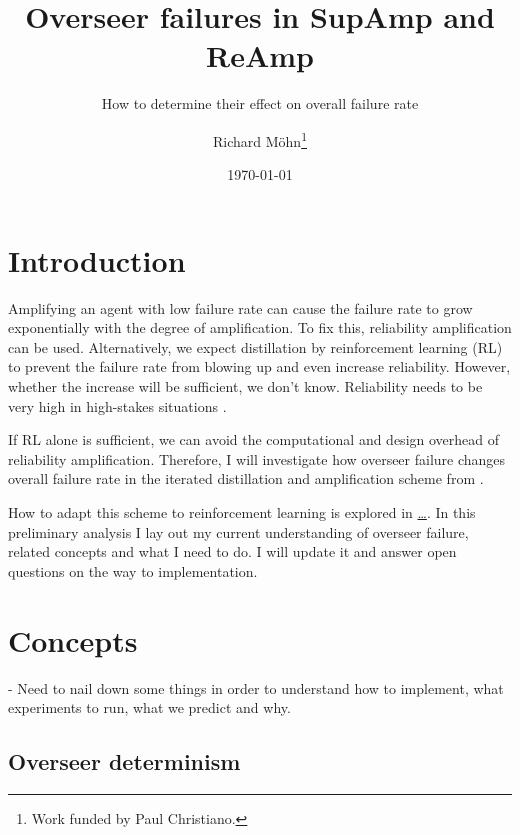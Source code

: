 \documentclass{farlamp}
\title{Overseer failures in SupAmp and ReAmp}
\subtitle{How to determine their effect on overall failure rate}
\author{Richard Möhn\thanks{Work funded by Paul Christiano.}}
\date{\today}
\begin{document}
\maketitle
\tableofcontents

\section{Introduction}

Amplifying an agent with low failure rate can cause the failure rate to grow
exponentially with the degree of amplification. To fix this, reliability
amplification can be used. Alternatively, we expect distillation by
reinforcement learning (RL) to prevent the failure rate from blowing up and even
increase reliability.
However, whether the increase will be sufficient, we don't know.
\parencite{ChriRelAmp} Reliability needs to be very high in high-stakes
situations \parencite[see][]{ChriLearCata}.

If RL alone is sufficient, we can avoid the computational and design overhead of
reliability amplification. Therefore, I will investigate how overseer failure
changes overall failure rate in the iterated distillation and amplification
scheme from \textcite{CSASupAmp}.

How to adapt this scheme to reinforcement learning is explored in \href{…}{…}.
In this preliminary analysis I lay out my current understanding of overseer
failure, related concepts and what I need to do. I will update it and answer
open questions on the way to implementation.


\section{Concepts}

- Need to nail down some things in order to understand how to implement, what
experiments to run, what we predict and why.


\subsection{Overseer determinism}
\end{document}
